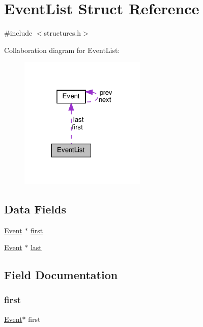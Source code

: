 \hypertarget{struct_event_list}{}\section{Event\+List Struct Reference}
\label{struct_event_list}


{\ttfamily \#include $<$structures.\+h$>$}



Collaboration diagram for Event\+List\+:\nopagebreak
\begin{figure}[H]
\begin{center}
\leavevmode
\includegraphics[width=170pt]{struct_event_list__coll__graph}
\end{center}
\end{figure}
\subsection*{Data Fields}
\begin{DoxyCompactItemize}
\item 
\hyperlink{struct_event}{Event} $\ast$ \hyperlink{struct_event_list_ab866d72c6e161e5eb85d4940b0dbc62e}{first}
\item 
\hyperlink{struct_event}{Event} $\ast$ \hyperlink{struct_event_list_a8e52f53a3606d45d86182ce606e9369d}{last}
\end{DoxyCompactItemize}


\subsection{Field Documentation}
\mbox{\label{struct_event_list_ab866d72c6e161e5eb85d4940b0dbc62e}} 
\subsubsection{\texorpdfstring{first}{first}}
{\footnotesize\ttfamily \hyperlink{struct_event}{Event}$\ast$ first}

